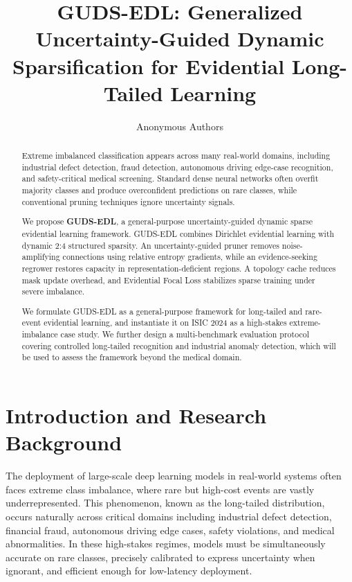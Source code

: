 \documentclass[letterpaper]{article} %
\title{GUDS-EDL: Generalized Uncertainty-Guided Dynamic Sparsification for Evidential Long-Tailed Learning}
\author{Anonymous Authors}
\begin{document}
\maketitle

\begin{abstract}
Extreme imbalanced classification appears across many real-world domains, including industrial defect detection, fraud detection, autonomous driving edge-case recognition, and safety-critical medical screening. Standard dense neural networks often overfit majority classes and produce overconfident predictions on rare classes, while conventional pruning techniques ignore uncertainty signals. 

We propose \textbf{GUDS-EDL}, a general-purpose uncertainty-guided dynamic sparse evidential learning framework. GUDS-EDL combines Dirichlet evidential learning with dynamic 2:4 structured sparsity. An uncertainty-guided pruner removes noise-amplifying connections using relative entropy gradients, while an evidence-seeking regrower restores capacity in representation-deficient regions. A topology cache reduces mask update overhead, and Evidential Focal Loss stabilizes sparse training under severe imbalance. 

We formulate GUDS-EDL as a general-purpose framework for long-tailed and rare-event evidential learning, and instantiate it on ISIC 2024 as a high-stakes extreme-imbalance case study. We further design a multi-benchmark evaluation protocol covering controlled long-tailed recognition and industrial anomaly detection, which will be used to assess the framework beyond the medical domain.
\end{abstract}

\section{Introduction and Research Background}\label{sec:intro}

The deployment of large-scale deep learning models in real-world systems often faces extreme class imbalance, where rare but high-cost events are vastly underrepresented. This phenomenon, known as the long-tailed distribution, occurs naturally across critical domains including industrial defect detection, financial fraud, autonomous driving edge cases, safety violations, and medical abnormalities. In these high-stakes regimes, models must be simultaneously accurate on rare classes, precisely calibrated to express uncertainty when ignorant, and efficient enough for low-latency deployment.
\end{document}
